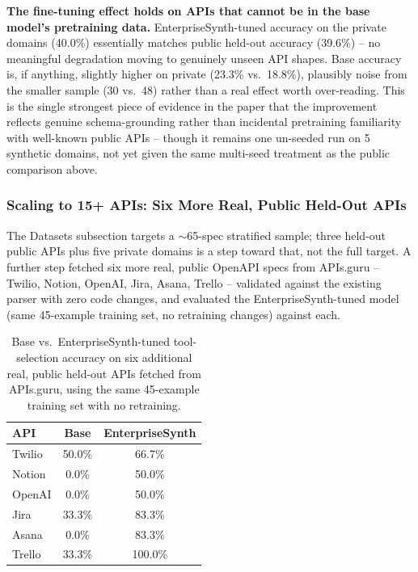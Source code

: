 \documentclass[letterpaper]{article} %
\begin{document}
\textbf{The fine-tuning effect holds on APIs that cannot be in the base model's pretraining
data.} EnterpriseSynth-tuned accuracy on the private domains (40.0\%) essentially matches public
held-out accuracy (39.6\%) -- no meaningful degradation moving to genuinely unseen API shapes.
Base accuracy is, if anything, slightly higher on private (23.3\% vs.\ 18.8\%), plausibly noise
from the smaller sample (30 vs.\ 48) rather than a real effect worth over-reading. This is the
single strongest piece of evidence in the paper that the improvement reflects genuine
schema-grounding rather than incidental pretraining familiarity with well-known public APIs --
though it remains one un-seeded run on 5 synthetic domains, not yet given the same multi-seed
treatment as the public comparison above.

\subsubsection{Scaling to 15+ APIs: Six More Real, Public Held-Out APIs}
The Datasets subsection targets a $\sim$65-spec stratified sample; three held-out public APIs
plus five private domains is a step toward that, not the full target. A further step fetched six
more real, public OpenAPI specs from APIs.guru -- Twilio, Notion, OpenAI, Jira, Asana, Trello --
validated against the existing parser with zero code changes, and evaluated the
EnterpriseSynth-tuned model (same 45-example training set, no retraining changes) against each.

\begin{table}[htbp]
\centering
\footnotesize
\setlength{\tabcolsep}{2pt}
\caption{Base vs.\ EnterpriseSynth-tuned tool-selection accuracy on six additional real, public
held-out APIs fetched from APIs.guru, using the same 45-example training set with no retraining.}
\label{tab:six-more-apis}
\begin{tabular}{lcc}
\toprule
\textbf{API} & \textbf{Base} & \textbf{EnterpriseSynth} \\
\midrule
Twilio & 50.0\% & 66.7\% \\
Notion & 0.0\% & 50.0\% \\
OpenAI & 0.0\% & 50.0\% \\
Jira & 33.3\% & 83.3\% \\
Asana & 0.0\% & 83.3\% \\
Trello & 33.3\% & 100.0\% \\
\bottomrule
\end{tabular}
\end{table}
\end{document}
